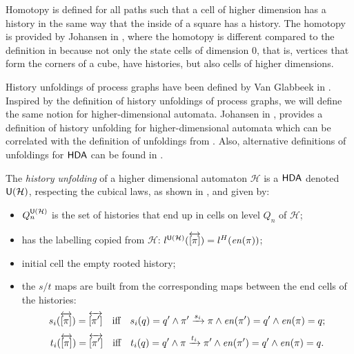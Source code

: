     Homotopy is defined for all paths such that a cell of higher dimension has a history in the same way that the inside of a square has a history. The homotopy is provided by Johansen in \cite{Johansen16STstruct}, where the homotopy is different compared to the definition in \cite[Section 1.6]{Goubault18RelationshipsModelsForConcurrency} because not only the state cells of dimension $0$, that is, vertices that form the corners of a cube, have histories, but also cells of higher dimensions.
    
    History unfoldings of process graphs have been defined by Van Glabbeek in \cite[Section 3]{Glabbeek96HistoryUnfolding}. Inspired by the definition of history unfoldings of process graphs, we will define the same notion for higher-dimensional automata. Johansen in \cite{Johansen16STstruct}, provides a definition of history unfolding for higher-dimensional automata which can be correlated with the definition of unfoldings from \cite{Glabbeek96HistoryUnfolding}. Also, alternative definitions of unfoldings for $\text{\textup{\textsf{HDA}}}$ can be found in \cite{Fahrenberg05PhD, Fahrenberg15PartialHDA}.

    \begin{definition}\label{def_unfolding_history} 
        The \emph{history unfolding} of a higher dimensional automaton $\mathcal{H}$ is a $\text{\textup{\textsf{HDA}}}$ denoted $\mathsf{U}(\mathcal{H})$, respecting the cubical laws, as shown in \cite[Proposition 3.30]{Johansen16STstruct}, and given by:
        
        \begin{itemize}
            \item $Q_{n}^{\mathsf{U}(\mathcal{H})}$ is the set of histories that end up in cells on level $Q_n$ of $\mathcal{H}$;
            \item has the labelling copied from $\mathcal{H}$: $l^{\mathsf{U}(\mathcal{H})}(\overleftrightarrow{[\pi]})=l^{H}(\mathit{en}(\pi))$;
            \item initial cell the empty rooted history;
            \item the $s/t$ maps are built from the corresponding maps between the end cells of the histories: 
                \[
                    s_{i}(\homotopyClass{\pi})=\homotopyClass{\pi'}\mbox{\ \ \ iff\ \ \ }s_{i}(q)=q'\wedge \pi'\transition{s_{i}}\pi\wedge \finishPath{\pi'}=q'\wedge \finishPath{\pi}=q;
                \]
                \[
                    t_{i}(\overleftrightarrow{[\pi]})=\overleftrightarrow{[\pi']} \mbox{\ \ \ iff\ \ \ } t_{i}(q)=q' \wedge \pi\xrightarrow{t_{i}}\pi' \wedge \mathit{en}(\pi')=q'\wedge \mathit{en}(\pi)=q.
                \]
        \end{itemize}
    \end{definition}
    
